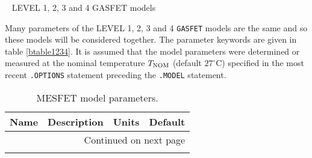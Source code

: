 \newpage
\ \myThickLine
\label{b:level1234:start}
LEVEL 1, 2, 3 and 4 GASFET models
\myline

Many parameters of the LEVEL 1, 2, 3 and 4 {\tt GASFET} models are the same
and so these models will be considered together.  The parameter keywords
are given in table \ref{btable1234}.
It is assumed that the model parameters were determined or
measured at the nominal temperature $T_{\mbox{\scriptsize NOM}}$ (default
$27^{\circ}$C) specified in the most recent {\tt .OPTIONS} statement
preceding the {\tt .MODEL} statement.

\begin{longtable}[h]{|p{0.6in}|p{3.5in}|p{0.6in}|p{0.6in}|}
\caption[MESFET model parameters.]{MESFET model parameters.}\\

\hline
\multicolumn{1}{|c}{\bf Name} &
\multicolumn{1}{|c}{\parbox{2.77in}{\bf Description}}  &
\multicolumn{1}{|c}{\bf Units} &
\multicolumn{1}{|c|}{\bf Default}\\ \hline
\endhead

\hline \multicolumn{4}{|r|}{{Continued on next page}} \\ \hline
\endfoot

\hline \hline
\endlastfoot


\end{longtable}
